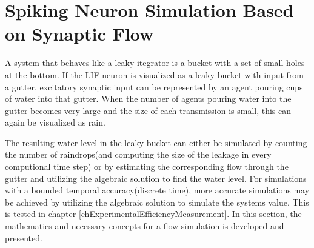 
\section{Spiking Neuron Simulation Based on Synaptic Flow}
	\label{secDevelopmentOfTheNovelANNmodel}
	A system that behaves like a leaky itegrator is a bucket with a set of small holes at the bottom.
	If the LIF neuron is visualized as a leaky bucket with input from a gutter, excitatory synaptic input can be represented by an agent pouring cups of water into that gutter.
	When the number of agents pouring water into the gutter becomes very large and the size of each transmission is small, this can again be visualized as rain.

	The resulting water level in the leaky bucket can either be simulated by counting the number of raindrops(and computing the size of the leakage in every computional time step)
		or by estimating the corresponding flow through the gutter and utilizing the algebraic solution to find the water level.
	For simulations with a bounded temporal accuracy(discrete time), more accurate simulations may be achieved by utilizing the algebraic solution to simulate the systems value.
	This is tested in chapter \ref{chExperimentalEfficiencyMeasurement}.
	In this section, the mathematics and necessary concepts for a flow simulation is developed and presented.




